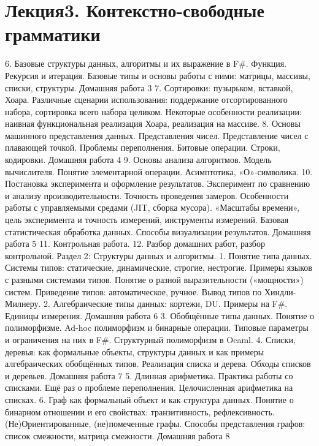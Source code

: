 \section{Лекция3. Контекстно-свободные грамматики}

    6. Базовые структуры данных, алгоритмы и их выражение в F#. Функция. Рекурсия и итерация.  Базовые типы и основы работы с ними: матрицы, массивы, списки, структуры. 
Домашняя работа 3
    7. Сортировки: пузырьком, вставкой, Хоара. Различные сценарии использования: поддержание отсортированного набора, сортировка всего набора целиком. Некоторые особенности реализации: наивная функциональная реализация Хоара, реализация на массиве.
    8. Основы машинного представления данных. Представления чисел. Представление чисел с плавающей точкой. Проблемы переполнения. Битовые операции. Строки, кодировки.
Домашняя работа 4
    9. Основы анализа алгоритмов. Модель вычислителя. Понятие элементарной операции. Асимптотика, «О»-символика.
    10. Постановка эксперимента и оформление результатов. Эксперимент по сравнению и анализу производительности.  Точность проведения замеров. Особенности работы с управляемыми средами (JIT, сборка мусора). «Масштабы времени», цель эксперимента и точность измерений, инструменты измерений. Базовая статистическая обработка данных. Способы визуализации результатов.  
Домашняя работа 5
    11. Контрольная работа.
    12. Разбор домашних работ, разбор контрольной.
Раздел 2: Структуры данных и алгоритмы.
    1. Понятие типа данных. Системы типов: статические, динамические, строгие, нестрогие. Примеры языков с разными системами типов. Понятие о разной выразительности («мощности») систем. Приведение типов: автоматическое, ручное. Вывод типов по Хиндли-Милнеру.
    2. Алгебраические типы данных: кортежи, DU. Примеры на F#. Единицы измерения.
Домашняя работа 6
    3. Обобщённые типы данных. Понятие о полиморфизме. Ad-hoc полиморфизм и бинарные операции. Типовые параметры и ограничения на них в F#. Структурный полиморфизм в Ocaml.
    4. Списки, деревья: как формальные объекты, структуры данных и как примеры алгебраических обобщённых типов. Реализация списка и дерева. Обходы списков и деревьев. 
Домашняя работа 7
    5. Длинная арифметика. Практика работы со списками. Ещё раз о проблеме переполнения. Целочисленная арифметика на списках. 
    6. Граф как формальный объект и как структура данных. Понятие о бинарном отношении и его свойствах: транзитивность, рефлексивность. (Не)Ориентированные, (не)помеченные графы. Способы представления графов: список смежности, матрица смежности.
Домашняя работа 8
